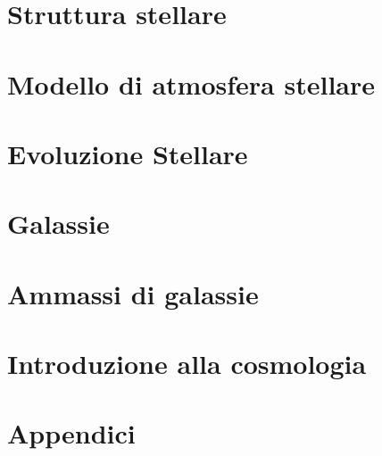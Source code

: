 \documentclass[11pt]{book} %
\begin{document}
\chapter{Struttura stellare}









\chapter{Modello di atmosfera stellare}



\chapter{Evoluzione Stellare}






\chapter{Galassie}









\chapter{Ammassi di galassie}




\chapter{Introduzione alla cosmologia}






%

\appendix
\chapter{Appendici}
%
%
%
\end{document}
